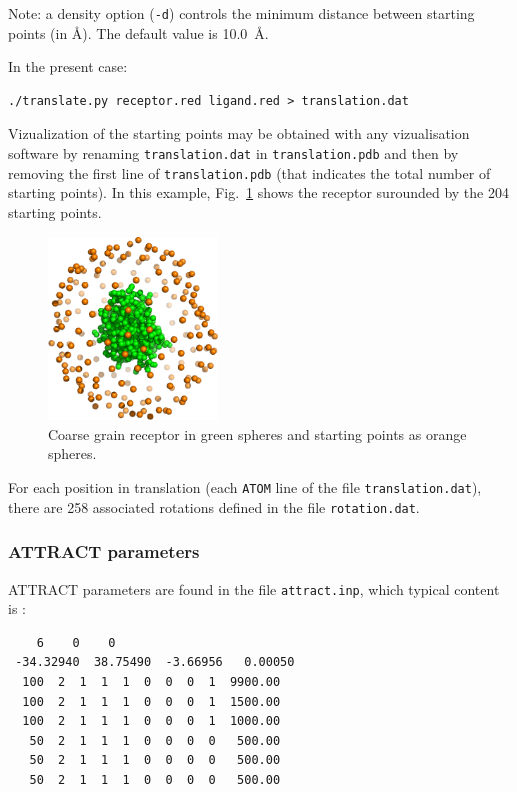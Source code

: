 \documentclass[12pt,a4paper]{article}
\begin{document}
Note: a density option ({\tt -d}) controls the minimum distance between starting
points (in \AA). The default value is 10.0~\AA. 

In the present case:
\begin{verbatim}
./translate.py receptor.red ligand.red > translation.dat
\end{verbatim}

Vizualization of the starting points may be obtained with any vizualisation 
software by renaming {\tt translation.dat} in {\tt translation.pdb} and then
by removing the first line of {\tt translation.pdb} (that indicates the total 
number of starting points). In this example, Fig.~\ref{1CGI_translation} shows
the receptor surounded by the 204 starting points.

\begin{figure}[htbp]
\center
\includegraphics*[width=0.4\textwidth]{img/1CGI_translation.png}
\caption{Coarse grain receptor in green spheres and starting points as orange spheres.}
\label{1CGI_translation}
\end{figure}

For each position in translation (each {\tt ATOM} line of the file {\tt translation.dat}), 
there are 258 associated rotations defined in the file {\tt rotation.dat}. 

\subsubsection{ATTRACT parameters}

ATTRACT parameters are found in the file {\tt attract.inp}, which typical content is :

\linenumbers*
\begin{verbatim}
    6    0    0
 -34.32940  38.75490  -3.66956   0.00050
  100  2  1  1  1  0  0  0  1  9900.00
  100  2  1  1  1  0  0  0  1  1500.00
  100  2  1  1  1  0  0  0  1  1000.00
   50  2  1  1  1  0  0  0  0   500.00
   50  2  1  1  1  0  0  0  0   500.00
   50  2  1  1  1  0  0  0  0   500.00
\end{verbatim}
\nolinenumbers
\end{document}
